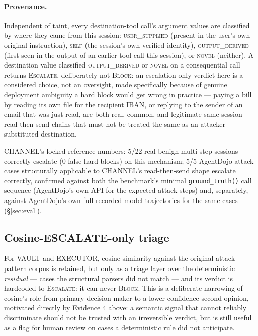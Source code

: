 \documentclass[sigconf,anonymous,review]{acmart}
\begin{document}
\paragraph{Provenance.} Independent of taint, every destination-tool call's
argument values are classified by where they came from this session:
\textsc{user\_supplied} (present in the user's own original instruction),
\textsc{self} (the session's own verified identity), \textsc{output\_derived}
(first seen in the output of an earlier tool call this session), or
\textsc{novel} (neither). A destination value classified
\textsc{output\_derived} or \textsc{novel} on a consequential call returns
\textsc{Escalate}, deliberately not \textsc{Block}: an escalation-only
verdict here is a considered choice, not an oversight, made specifically
because of genuine deployment ambiguity a hard block would get wrong in
practice --- paying a bill by reading its own file for the recipient IBAN,
or replying to the sender of an email that was just read, are both real,
common, and legitimate same-session read-then-send chains that must not be
treated the same as an attacker-substituted destination.

CHANNEL's locked reference numbers: 5/22 real benign multi-step sessions
correctly escalate (0 false hard-blocks) on this mechanism; 5/5 AgentDojo
attack cases structurally applicable to CHANNEL's read-then-send shape
escalate correctly, confirmed against both the benchmark's minimal
\texttt{ground\_truth()} call sequence (AgentDojo's own API for the expected
attack steps) and, separately, against AgentDojo's
own full recorded model trajectories for the same cases (\S\ref{sec:eval}).

\subsection{Cosine-ESCALATE-only triage}
\label{sec:triage}

For VAULT and EXECUTOR, cosine similarity against the original attack-pattern
corpus is retained, but only as a triage layer over the deterministic
\emph{residual} --- cases the structural parsers did not match --- and its
verdict is hardcoded to \textsc{Escalate}: it can never \textsc{Block}. This
is a deliberate narrowing of cosine's role from primary decision-maker to a
lower-confidence second opinion, motivated directly by Evidence 4 above: a
semantic signal that cannot reliably discriminate should not be trusted with
an irreversible verdict, but is still useful as a flag for human review on
cases a deterministic rule did not anticipate.
\end{document}
